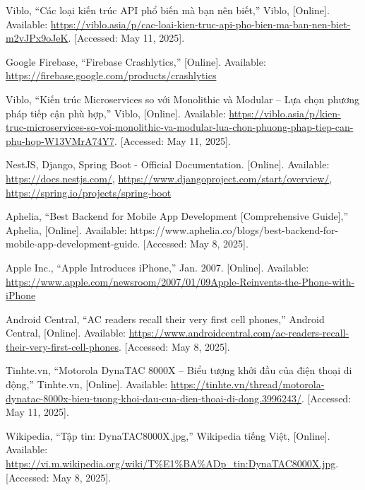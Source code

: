 \documentclass[12pt]{report}
\begin{document}
\begin{thebibliography}{1}



Viblo, “Các loại kiến trúc API phổ biến mà bạn nên biết,” Viblo, [Online]. Available: \url{https://viblo.asia/p/cac-loai-kien-truc-api-pho-bien-ma-ban-nen-biet-m2vJPx9oJeK}. [Accessed: May 11, 2025].

  
  Google Firebase, “Firebase Crashlytics,” [Online]. Available: \url{https://firebase.google.com/products/crashlytics}
  
Viblo, “Kiến trúc Microservices so với Monolithic và Modular – Lựa chọn phương pháp tiếp cận phù hợp,” Viblo, [Online]. Available: \url{https://viblo.asia/p/kien-truc-microservices-so-voi-monolithic-va-modular-lua-chon-phuong-phap-tiep-can-phu-hop-W13VMrA74Y7}. [Accessed: May 11, 2025].

  
  NestJS, Django, Spring Boot - Official Documentation. [Online]. Available: \url{https://docs.nestjs.com/}, \url{https://www.djangoproject.com/start/overview/}, \url{https://spring.io/projects/spring-boot}

  Aphelia, “Best Backend for Mobile App Development [Comprehensive Guide],” Aphelia, [Online]. Available: https://www.aphelia.co/blogs/best-backend-for-mobile-app-development-guide. [Accessed: May 8, 2025].


  Apple Inc., ``Apple Introduces iPhone,'' Jan. 2007. [Online]. Available: \url{https://www.apple.com/newsroom/2007/01/09Apple-Reinvents-the-Phone-with-iPhone}

  Android Central, “AC readers recall their very first cell phones,” Android Central, [Online]. Available: \url{https://www.androidcentral.com/ac-readers-recall-their-very-first-cell-phones}. [Accessed: May 8, 2025].


  Tinhte.vn, “Motorola DynaTAC 8000X – Biểu tượng khởi đầu của điện thoại di động,” Tinhte.vn, [Online]. Available: \url{https://tinhte.vn/thread/motorola-dynatac-8000x-bieu-tuong-khoi-dau-cua-dien-thoai-di-dong.3996243/}. [Accessed: May 11, 2025].


  Wikipedia, “Tập tin: DynaTAC8000X.jpg,” Wikipedia tiếng Việt, [Online]. Available: \url{https://vi.m.wikipedia.org/wiki/T%E1%BA%ADp_tin:DynaTAC8000X.jpg}. [Accessed: May 8, 2025].


\end{thebibliography}
\end{document}
